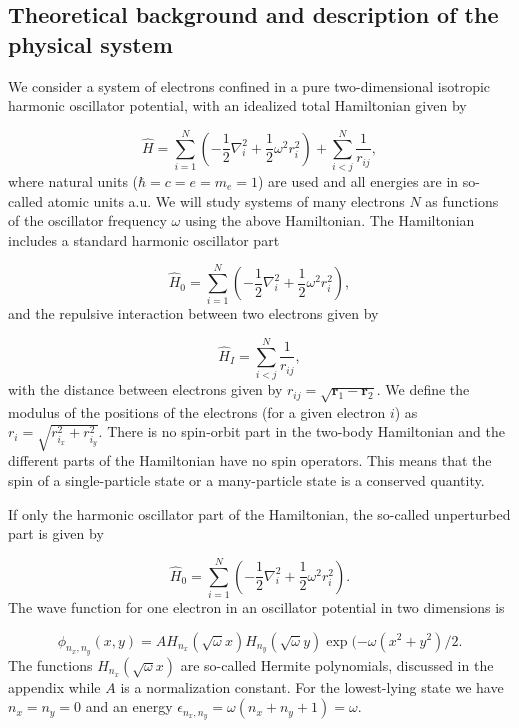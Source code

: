 \documentclass[%
oneside,                 %
final,                   %
10pt]{article}
\begin{document}
\subsection{Theoretical background and description of the physical system}

We consider a system of electrons confined in a pure two-dimensional 
isotropic harmonic oscillator potential, with an idealized  total Hamiltonian given by

\begin{equation}
\label{eq:finalH}
\hat{H}=\sum_{i=1}^{N} \left(  -\frac{1}{2} \nabla_i^2 + \frac{1}{2} \omega^2r_i^2  \right)+\sum_{i<j}^{N}\frac{1}{r_{ij}},
\end{equation}
where natural units ($\hbar=c=e=m_e=1$) are used and all energies are in so-called atomic units a.u. We will study systems of many electrons $N$ as functions of the oscillator frequency  $\omega$ using the above Hamiltonian.  The Hamiltonian includes a standard harmonic oscillator part

\begin{equation*}
\hat{H}_0=\sum_{i=1}^{N} \left(  -\frac{1}{2} \nabla_i^2 + \frac{1}{2} \omega^2r_i^2  \right),
\end{equation*}
and the repulsive interaction between two electrons given by

\begin{equation*}
\hat{H}_I=\sum_{i < j}^{N}\frac{1}{r_{ij}},
\end{equation*}
with the distance between electrons given by $r_{ij}=\sqrt{\bm{r}_1-\bm{r}_2}$. We define the 
modulus of the positions of the electrons (for a given electron $i$) as $r_i = \sqrt{r_{i_x}^2+r_{i_y}^2}$.
There is no spin-orbit part in the two-body Hamiltonian and the different parts of the Hamiltonian have no spin operators. This means that the spin of a single-particle state or a many-particle state is a conserved quantity. 

If only the harmonic oscillator part of the Hamiltonian,
the so-called unperturbed part is given by

\begin{equation*} \hat{H}_0=\sum_{i=1}^{N} \left(  -\frac{1}{2} \nabla_i^2 + \frac{1}{2} \omega^2r_i^2  \right).
\end{equation*}
The wave function for one electron in an oscillator potential in two dimensions is

\begin{equation*}
\phi_{n_x,n_y}(x,y) = A H_{n_x}(\sqrt{\omega}x)H_{n_y}(\sqrt{\omega}y)\exp{(-\omega(x^2+y^2)/2}.
\end{equation*}
The functions $H_{n_x}(\sqrt{\omega}x)$ are so-called Hermite polynomials, discussed in the appendix while $A$ is a normalization constant. 
For the lowest-lying state we have $n_x=n_y=0$ and an energy $\epsilon_{n_x,n_y}=\omega(n_x+n_y+1) = \omega$.
\end{document}
